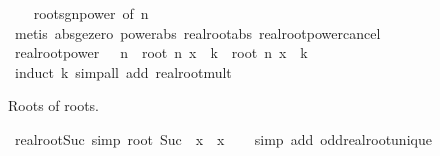 \begin{isabellebody}
%
\isadelimproof
\ \ %
\endisadelimproof
%
\isatagproof
{}\isamarkupfalse%
\ root{\isacharunderscore}{\kern0pt}sgn{\isacharunderscore}{\kern0pt}power\ {\isacharbrackleft}{\kern0pt}of\ n{\isacharbrackright}{\kern0pt}\isanewline
\ \ \isamarkupfalse%
\ {\isacharparenleft}{\kern0pt}metis\ abs{\isacharunderscore}{\kern0pt}ge{\isacharunderscore}{\kern0pt}zero\ power{\isacharunderscore}{\kern0pt}abs\ real{\isacharunderscore}{\kern0pt}root{\isacharunderscore}{\kern0pt}abs\ real{\isacharunderscore}{\kern0pt}root{\isacharunderscore}{\kern0pt}power{\isacharunderscore}{\kern0pt}cancel{\isacharparenright}{\kern0pt}%
\endisatagproof
{\isafoldproof}%
%
\isadelimproof
\isanewline
%
\endisadelimproof
\isanewline
{}\isamarkupfalse%
\ real{\isacharunderscore}{\kern0pt}root{\isacharunderscore}{\kern0pt}power{\isacharcolon}{\kern0pt}\ {\isachardoublequoteopen}{}\ {\isacharless}{\kern0pt}\ n\ {\isasymLongrightarrow}\ root\ n\ {\isacharparenleft}{\kern0pt}x\ {\isacharcircum}{\kern0pt}\ k{\isacharparenright}{\kern0pt}\ {\isacharequal}{\kern0pt}\ root\ n\ x\ {\isacharcircum}{\kern0pt}\ k{\isachardoublequoteclose}\isanewline
%
\isadelimproof
\ \ %
\endisadelimproof
%
\isatagproof
{}\isamarkupfalse%
\ {\isacharparenleft}{\kern0pt}induct\ k{\isacharparenright}{\kern0pt}\ {\isacharparenleft}{\kern0pt}simp{\isacharunderscore}{\kern0pt}all\ add{\isacharcolon}{\kern0pt}\ real{\isacharunderscore}{\kern0pt}root{\isacharunderscore}{\kern0pt}mult{\isacharparenright}{\kern0pt}%
\endisatagproof
{\isafoldproof}%
%
\isadelimproof
%
\endisadelimproof
%
\begin{isamarkuptext}%
Roots of roots.%
\end{isamarkuptext}\isamarkuptrue%
\isamarkupfalse%
\ real{\isacharunderscore}{\kern0pt}root{\isacharunderscore}{\kern0pt}Suc{\isacharunderscore}{\kern0pt}{}\ {\isacharbrackleft}{\kern0pt}simp{\isacharbrackright}{\kern0pt}{\isacharcolon}{\kern0pt}\ {\isachardoublequoteopen}root\ {\isacharparenleft}{\kern0pt}Suc\ {}{\isacharparenright}{\kern0pt}\ x\ {\isacharequal}{\kern0pt}\ x{\isachardoublequoteclose}\isanewline
%
\isadelimproof
\ \ %
\endisadelimproof
%
\isatagproof
{}\isamarkupfalse%
\ {\isacharparenleft}{\kern0pt}simp\ add{\isacharcolon}{\kern0pt}\ odd{\isacharunderscore}{\kern0pt}real{\isacharunderscore}{\kern0pt}root{\isacharunderscore}{\kern0pt}unique{\isacharparenright}{\kern0pt}%
\endisatagproof
{\isafoldproof}%
%
\isadelimproof
\isanewline
%
\endisadelimproof
\isanewline
{}\isamarkupfalse%

\end{isabellebody}
